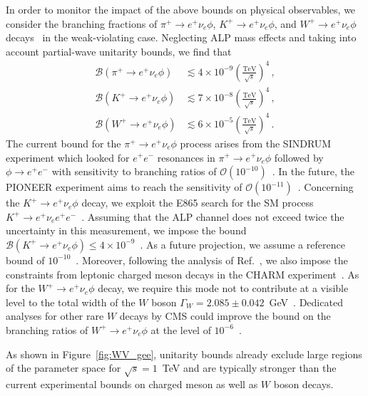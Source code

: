 In order to monitor the impact of the above bounds on physical observables, we consider the branching fractions of $\pi^+\to e^+\nu_e \phi$, $K^+\to e^+\nu_e \phi$, and $W^+\to e^+\nu_e \phi$ decays~\cite{Altmannshofer:2022ckw} in the weak-violating case. 
Neglecting ALP mass effects and taking into account partial-wave unitarity bounds, we find that
%
\begin{align}
    \mathcal B(\pi^+ \to e^+ \nu_e \phi) &\lesssim 4 \times 10^{-9}\left(\frac{\text{TeV}}{\sqrt{s}}\right)^4 \,,
    \\
    \mathcal B(K^+ \to e^+ \nu_e \phi) &\lesssim 7 \times 10^{-8} \left(\frac{\text{TeV}}{\sqrt{s}}\right)^4\,,
    \\
    \mathcal B(W^+ \to e^+ \nu_e \phi) &\lesssim 6 \times 10^{-5} \left(\frac{\text{TeV}}{\sqrt{s}}\right)^4\,.
\end{align}
%
The current bound for the 
$\pi^+ \to e^+ \nu_e \phi$ process arises from the SINDRUM experiment which looked for $e^+e^-$ resonances in $\pi^+ \to e^+ \nu_e \phi$ followed by 
$\phi \to e^+e^-$
with sensitivity to branching ratios of $\mathcal{O}(10^{-10})$~\cite{SINDRUM:1986klz}.
In the future, the PIONEER experiment aims to reach 
the sensitivity of $\mathcal{O}(10^{-11})$~\cite{PIONEER:2022yag}.
Concerning the $K^+ \to e^+ \nu_e \phi$ decay, 
we exploit the E865 search for the SM process 
$K^+ \to e^+ \nu_e e^+e^-$~\cite{Poblaguev:2002ug}. 
Assuming that the ALP channel does not exceed 
twice the uncertainty in this measurement, we impose
the bound $\mathcal{B}(K^+ \to e^+ \nu_e \phi) \leq 4 \times 10^{-9}$~\cite{Altmannshofer:2022ckw}. 
As a future projection, we assume a reference 
bound of $10^{-10}$~\cite{Altmannshofer:2022ckw}.
Moreover, following the analysis of Ref.~\cite{Altmannshofer:2022ckw}, we also impose 
the constraints from leptonic charged meson decays in the CHARM experiment~\cite{CHARM:1985anb}.
As for the $W^+ \to e^+ \nu_e \phi$ decay, we require this mode not to contribute at a visible level to the total width of the $W$ boson
$\Gamma_W = 2.085 \pm 0.042$~GeV~\cite{ParticleDataGroup:2022pth}.
Dedicated analyses for other rare $W$ decays by CMS could improve the bound on the branching ratios of $W^+ \to e^+ \nu_e \phi$ at the level of $10^{-6}$~\cite{Altmannshofer:2022ckw}.

As shown in Figure~\ref{fig:WV_gee}, unitarity bounds already exclude large regions of the parameter space for $\sqrt{s} = 1$~TeV and are typically stronger than the current experimental bounds on charged meson as well as $W$ boson decays.

